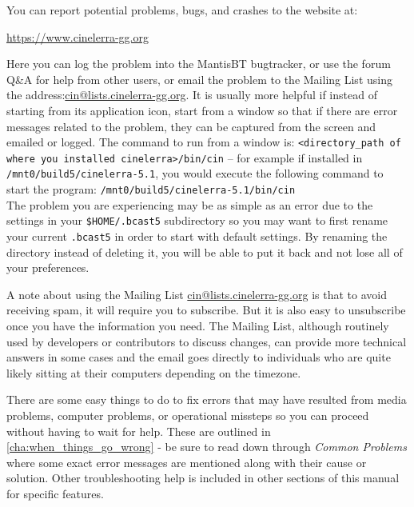 You can report potential problems, bugs, and crashes to the \CGG{} website at:

\begin{center}
	\href{https://www.cinelerra-gg.org/}{https://www.cinelerra-gg.org}
\end{center}

Here you can log the problem into the MantisBT bugtracker, or use the forum Q\&A for help from other users, or email the
problem to the Mailing List using the address:{\small \href{mailto:cin@lists.cinelerra-gg.org}{cin@lists.cinelerra-gg.org}}. It is usually more
helpful if instead of starting \CGG{} from its application icon, start from a window so that if there are error
messages related to the problem, they can be captured from the screen and emailed or logged. The command to run
from a window is: \texttt{<directory\_path of where you installed cinelerra>/bin/cin} -- for example if
installed in \texttt{/mnt0/build5/cinelerra-5.1}, you would execute the following command to start the program:
\newline \hspace*{1cm} \texttt{/mnt0/build5/cinelerra-5.1/bin/cin} \\
The problem you are experiencing may be as simple as an error due to the settings in your \texttt{\$HOME/.bcast5} subdirectory so you may want to first rename your current \texttt{.bcast5} in order to start with default settings. By renaming the directory instead of deleting it, you will be able to put it back and not lose all of your preferences.

A note about using the Mailing List {\small \href{mailto:cin@lists.cinelerra-gg.org}{cin@lists.cinelerra-gg.org}}
is that to avoid receiving spam, it will require you to subscribe.  But it is also easy to unsubscribe once you have
the information you need.  The Mailing List, although routinely used by developers or contributors to discuss 
changes, can provide more technical answers in some cases and the email goes directly to individuals who are quite
likely sitting at their computers depending on the timezone. 

There are some easy things to do to fix errors that may have resulted from media problems,
computer problems, or operational missteps so you can proceed without having to wait for help.  These
are outlined in \ref{cha:when_things_go_wrong} - be sure to read down through
\textit{Common Problems} where some exact error messages are mentioned along with their cause or solution.  Other 
troubleshooting help is included in other sections of this manual for specific features.

